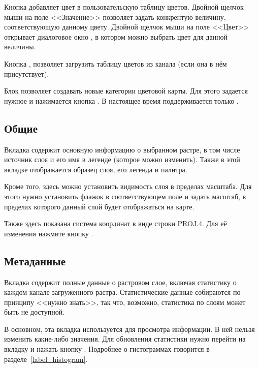 Кнопка  добавляет цвет в пользовательскую таблицу
цветов. Двойной щелчок мыши на поле <<Значение>>
позволяет задать конкрентую величину, соответствующую данному цвету. Двойной щелчок
мыши на поле <<Цвет>> открывает диалоговое окно , в котором
можно выбрать цвет для данной величины.

Кнопка ,
позволяет загрузить таблицу цветов из канала (если она в нём присутствует).

Блок  позволяет создавать
новые категории цветовой карты. Для этого задается нужное
 и нажимается кнопка
. В настоящее время поддерживается только
.

\subsection{Общие}\label{label_generaltab}

Вкладка  содержит основную информацию о выбранном растре,
в том числе источник слоя и его имя в легенде (которое можно изменить).
Также в этой вкладке отображается образец слоя, его легенда и палитра.

Кроме того, здесь можно установить видимость слоя в пределах
масштаба. Для этого нужно установить флажок в соответствующем поле и
задать масштаб, в пределах которого данный слой будет отображаться на
карте.

Также здесь показана система координат в виде строки PROJ.4. Для её изменения
нажмите кнопку .

\subsection{Метаданные}\label{label_metatab}

Вкладка  содержит полные данные о растровом слое,
включая статистику о каждом канале загруженного растра. Статистические
данные собираются по принципу <<нужно знать>>, так что, возможно,
статистика по слоям может быть не доступной.

В основном, эта вкладка используется для просмотра информации. В ней
нельзя изменить какие-либо значения. Для обновления статистики нужно
перейти на вкладку  и нажать кнопку .
Подробнее о гистограммах говорится в разделе~\ref{label_histogram}.

